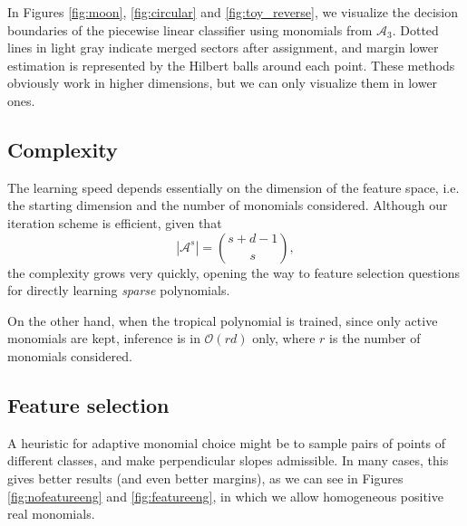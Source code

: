 \documentclass[oneside,UKenglish,a4paper]{amsart}
\numberwithin{equation}{section}
\numberwithin{figure}{section}
\theoremstyle{plain}
\theoremstyle{definition}
\theoremstyle{plain}
\theoremstyle{remark}
\theoremstyle{plain}
\theoremstyle{definition}
\theoremstyle{definition}
\begin{document}
In Figures \ref{fig:moon}, \ref{fig:circular} and \ref{fig:toy_reverse}, we visualize the decision boundaries of the piecewise linear classifier using monomials from $\mathcal{A}_3$. Dotted lines in light gray indicate merged sectors after assignment, and margin lower estimation is represented by the Hilbert balls around each point. These methods obviously work in higher dimensions, but we can only visualize them in lower ones.

\subsection*{Complexity}

The learning speed depends essentially on the dimension of the feature space, i.e. the starting dimension and the number of monomials considered. Although our iteration scheme is efficient, given that $$|\mathcal{A}^s| = \binom{s+d-1}{s},$$ the complexity grows very quickly, opening the way to feature selection questions for directly learning \emph{sparse} polynomials.

On the other hand, when the tropical polynomial is trained, since only active monomials are kept, inference is in $\mathcal{O}(rd)$ only, where $r$ is the number of monomials considered.

\subsection*{Feature selection}

A heuristic for adaptive monomial choice might be to sample pairs of points of different classes, and make perpendicular slopes admissible. In many cases, this gives better results (and even better margins), as we can see in Figures \ref{fig:nofeatureeng} and \ref{fig:featureeng}, in which we allow homogeneous positive real monomials.
\end{document}
